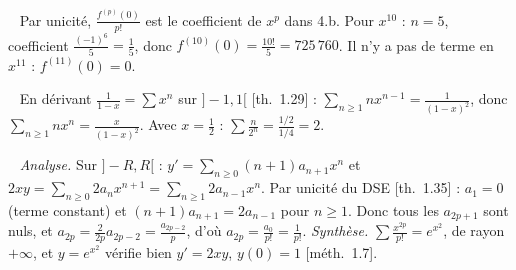 \documentclass[a4paper,11pt]{article}
\newcommand{\q}[1]{\par\needspace{3\baselineskip}\smallskip{\sffamily\bfseries\color{Bleu}#1}\ }
\newcommand{\prop}[1]{{\sffamily\footnotesize\color{Gris}[#1]}}
\begin{document}
\q{4.e)} Par unicité, $\frac{f^{(p)}(0)}{p!}$ est le coefficient de $x^p$ dans 4.b. Pour $x^{10}$ : $n=5$, coefficient $\frac{(-1)^6}5=\frac15$, donc
$f^{(10)}(0)=\frac{10!}5=725\,760$. Il n'y a pas de terme en $x^{11}$ : $f^{(11)}(0)=0$.

\q{5.} En dérivant $\frac1{1-x}=\sum x^n$ sur $]-1,1[$ \prop{th.~1.29} : $\sum_{n\geq1}nx^{n-1}=\frac1{(1-x)^2}$, donc $\sum_{n\geq1}nx^n=\frac x{(1-x)^2}$.
Avec $x=\frac12$ : $\sum\frac n{2^n}=\frac{1/2}{1/4}=2$.

\q{6.} \emph{Analyse.} Sur $]-R,R[$ : $y'=\sum_{n\geq0}(n+1)a_{n+1}x^n$ et $2xy=\sum_{n\geq0}2a_nx^{n+1}=\sum_{n\geq1}2a_{n-1}x^n$. Par unicité du DSE
\prop{th.~1.35} : $a_1=0$ (terme constant) et $(n+1)a_{n+1}=2a_{n-1}$ pour $n\geq1$. Donc tous les $a_{2p+1}$ sont nuls, et
$a_{2p}=\frac2{2p}a_{2p-2}=\frac{a_{2p-2}}p$, d'où $a_{2p}=\frac{a_0}{p!}=\frac1{p!}$. \emph{Synthèse.} $\sum\frac{x^{2p}}{p!}=e^{x^2}$, de rayon $+\infty$, et
$y=e^{x^2}$ vérifie bien $y'=2xy$, $y(0)=1$ \prop{méth.~1.7}.
\end{document}
